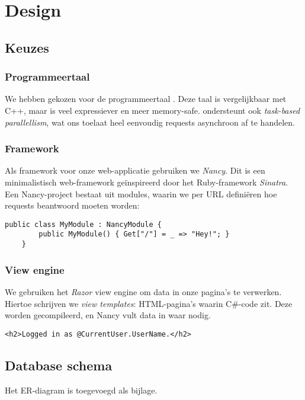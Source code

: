 \documentclass[12pt,a4paper,parskip=full]{article}
\begin{document}
\section{Design}

\subsection{Keuzes}
\subsubsection{Programmeertaal}
We hebben gekozen voor de programmeertaal \CS{}. Deze taal is vergelijkbaar met
C++, maar is veel expressiever en meer memory-safe. \CS{} ondersteunt ook 
\textit{task-based parallellism}, wat ons toelaat heel eenvoudig requests 
asynchroon af te handelen.

\subsubsection{Framework}
Als framework voor onze web-applicatie gebruiken we \textit{Nancy}. Dit is een 
minimalistisch web-framework ge\"inspireerd door het Ruby-framework 
\textit{Sinatra}. Een Nancy-project bestaat uit modules, waarin we per URL 
defini\"eren hoe requests beantwoord moeten worden:

\begin{lstlisting}[caption=Een \textit{hello world}-applicatie in Nancy]
    public class MyModule : NancyModule {
        public MyModule() { Get["/"] = _ => "Hey!"; }
    }
\end{lstlisting}

\subsubsection{View engine}
We gebruiken het \textit{Razor} view engine om data in onze pagina's te 
verwerken. Hiertoe schrijven we \textit{view templates}: HTML-pagina's waarin 
C\#-code zit. Deze worden gecompileerd, en Nancy vult data in waar nodig.

\lstset{language=HTML}
\begin{lstlisting}[caption=Een simpel voorbeeld van een Razor view, label=razor]
    <h2>Logged in as @CurrentUser.UserName.</h2>
\end{lstlisting}

\subsection{Database schema}
Het ER-diagram is toegevoegd als bijlage.
\end{document}
